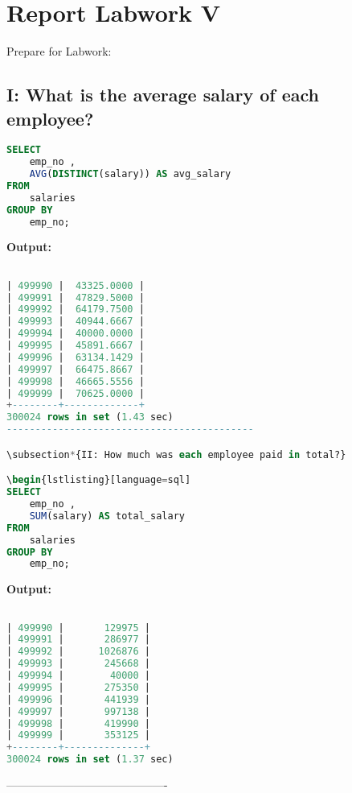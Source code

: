\documentclass[12pt]{report}
\begin{document}
\section*{Report Labwork V}

Prepare for Labwork:

{\small
{}}


\subsection*{I: What is the average salary of each employee?}

\begin{lstlisting}[language=sql]
SELECT
	emp_no ,
	AVG(DISTINCT(salary)) AS avg_salary
FROM
	salaries
GROUP BY
	emp_no;
\end{lstlisting}
\textbf{Output:}

\begin{lstlisting}[language=sql]

| 499990 |  43325.0000 |
| 499991 |  47829.5000 |
| 499992 |  64179.7500 |
| 499993 |  40944.6667 |
| 499994 |  40000.0000 |
| 499995 |  45891.6667 |
| 499996 |  63134.1429 |
| 499997 |  66475.8667 |
| 499998 |  46665.5556 |
| 499999 |  70625.0000 |
+--------+-------------+
300024 rows in set (1.43 sec)
-------------------------------------------

\subsection*{II: How much was each employee paid in total?}

\begin{lstlisting}[language=sql]
SELECT
	emp_no ,
	SUM(salary) AS total_salary
FROM
	salaries
GROUP BY
	emp_no;

\end{lstlisting}
\textbf{Output:}

\begin{lstlisting}[language=sql]

| 499990 |       129975 |
| 499991 |       286977 |
| 499992 |      1026876 |
| 499993 |       245668 |
| 499994 |        40000 |
| 499995 |       275350 |
| 499996 |       441939 |
| 499997 |       997138 |
| 499998 |       419990 |
| 499999 |       353125 |
+--------+--------------+
300024 rows in set (1.37 sec)

\end{lstlisting}
-------------------------------------------
\end{document}
